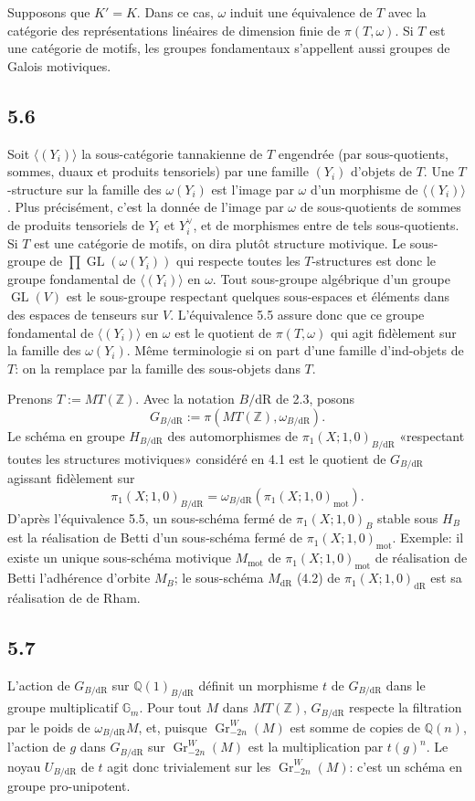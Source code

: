 \documentclass[10pt]{article}
\newcommand{\Q}{\mathbb Q}
\newcommand{\Z}{\mathbb Z}
\newcommand{\Gm}{\mathbb G_m}
\newcommand{\GL}{\operatorname{GL}}
\newcommand{\Gr}{\operatorname{Gr}}
\newcommand{\dR}{\mathrm{dR}}
\newcommand{\mot}{\mathrm{mot}}
\begin{document}
Supposons que $K'=K$. Dans ce cas, $\omega$ induit une équivalence de $T$ avec la catégorie des représentations linéaires de dimension finie de $\pi(T,\omega)$. Si $T$ est une catégorie de motifs, les groupes fondamentaux s'appellent aussi groupes de Galois motiviques.

\subsection*{5.6}
Soit $\langle(Y_i)\rangle$ la sous-catégorie tannakienne de $T$ engendrée (par sous-quotients, sommes, duaux et produits tensoriels) par une famille $(Y_i)$ d'objets de $T$. Une $T$-structure sur la famille des $\omega(Y_i)$ est l'image par $\omega$ d'un morphisme de $\langle(Y_i)\rangle$. Plus précisément, c'est la donnée de l'image par $\omega$ de sous-quotients de sommes de produits tensoriels de $Y_i$ et $Y_i^\vee$, et de morphismes entre de tels sous-quotients. Si $T$ est une catégorie de motifs, on dira plutôt structure motivique. Le sous-groupe de $\prod\GL(\omega(Y_i))$ qui respecte toutes les $T$-structures est donc le groupe fondamental de $\langle(Y_i)\rangle$ en $\omega$. Tout sous-groupe algébrique d'un groupe $\GL(V)$ est le sous-groupe respectant quelques sous-espaces et éléments dans des espaces de tenseurs sur $V$. L'équivalence 5.5 assure donc que ce groupe fondamental de $\langle(Y_i)\rangle$ en $\omega$ est le quotient de $\pi(T,\omega)$ qui agit fidèlement sur la famille des $\omega(Y_i)$. Même terminologie si on part d'une famille d'ind-objets de $T$: on la remplace par la famille des sous-objets dans $T$.

Prenons $T:=MT(\Z)$. Avec la notation $B/\dR$ de 2.3, posons
\begin{equation}
 G_{B/\dR}:=\pi(MT(\Z),\omega_{B/\dR}).
\tag{5.6.1}
\end{equation}
Le schéma en groupe $H_{B/\dR}$ des automorphismes de $\pi_1(X;1,0)_{B/\dR}$ «respectant toutes les structures motiviques» considéré en 4.1 est le quotient de $G_{B/\dR}$ agissant fidèlement sur
\[
 \pi_1(X;1,0)_{B/\dR}=\omega_{B/\dR}(\pi_1(X;1,0)_{\mot}).
\]
D'après l'équivalence 5.5, un sous-schéma fermé de $\pi_1(X;1,0)_B$ stable sous $H_B$ est la réalisation de Betti d'un sous-schéma fermé de $\pi_1(X;1,0)_{\mot}$. Exemple: il existe un unique sous-schéma motivique $M_{\mot}$ de $\pi_1(X;1,0)_{\mot}$ de réalisation de Betti l'adhérence d'orbite $M_B$; le sous-schéma $M_{\dR}$ (4.2) de $\pi_1(X;1,0)_{\dR}$ est sa réalisation de de Rham.

\subsection*{5.7}
L'action de $G_{B/\dR}$ sur $\Q(1)_{B/\dR}$ définit un morphisme $t$ de $G_{B/\dR}$ dans le groupe multiplicatif $\Gm$. Pour tout $M$ dans $MT(\Z)$, $G_{B/\dR}$ respecte la filtration par le poids de $\omega_{B/\dR}M$, et, puisque $\Gr^W_{-2n}(M)$ est somme de copies de $\Q(n)$, l'action de $g$ dans $G_{B/\dR}$ sur $\Gr^W_{-2n}(M)$ est la multiplication par $t(g)^n$. Le noyau $U_{B/\dR}$ de $t$ agit donc trivialement sur les $\Gr^W_{-2n}(M)$: c'est un schéma en groupe pro-unipotent.
\end{document}
